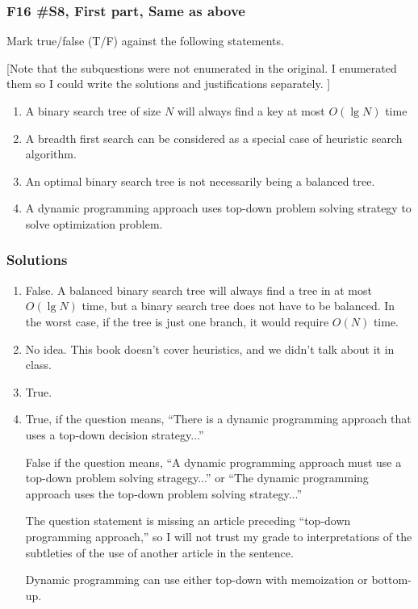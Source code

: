 \subsubsection{F16 \#S8, First part, Same as above}
	Mark true/false (T/F) against the following statements.  
	
	[Note that the subquestions were not enumerated in the original.  I enumerated them so I could write the solutions and justifications separately.  ]
	
	\begin{enumerate}
		\item A binary search tree of size $N$ will always find a key at most $O(\lg N)$ time
		\item A breadth first search can be considered as a special case of heuristic search algorithm.
		\item An optimal binary search tree is not necessarily being a balanced tree.
		\item A dynamic programming approach uses top-down problem solving strategy to solve optimization problem.
	\end{enumerate}
	
\subsubsection{Solutions}

\begin{enumerate}
	\item False.  A balanced binary search tree will always find a tree in at most $O(\lg N)$ time, but a binary search tree does not have to be balanced.  In the worst case, if the tree is just one branch, it would require $O(N)$ time.  
	\item No idea.  This book doesn't cover heuristics, and we didn't talk about it in class.  
	\item True.  
	\item True, if the question means, ``There is a dynamic programming approach that uses a top-down decision strategy...''  
	
	False if the question means, ``A dynamic programming approach must use a top-down problem solving stragegy...''  or ``The dynamic programming approach uses the top-down problem solving strategy...''
	
	The question statement is missing an article preceding ``top-down programming approach,'' so I will not trust my grade to interpretations of the subtleties of the use of another article in the sentence.
	
	Dynamic programming can use either top-down with memoization or bottom-up.  
\end{enumerate}




